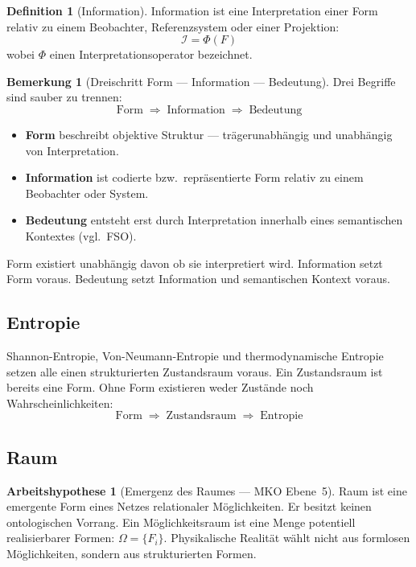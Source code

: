 \documentclass[11pt,a4paper]{article}
\theoremstyle{plain}
\theoremstyle{definition}
\newtheorem{definition}{Definition}[section]
\newtheorem{remark}{Bemerkung}[section]
\newtheorem{hypothese}{Arbeitshypothese}[section]
\begin{document}
\begin{definition}[Information]
Information ist eine Interpretation einer Form relativ zu einem Beobachter,
Referenzsystem oder einer Projektion:
\[
  \mathcal{I} = \Phi(F)
\]
wobei $\Phi$ einen Interpretationsoperator bezeichnet.
\end{definition}

\begin{remark}[Dreischritt Form --- Information --- Bedeutung]
Drei Begriffe sind sauber zu trennen:
\[
  \boxed{\text{Form} \;\Longrightarrow\; \text{Information}
  \;\Longrightarrow\; \text{Bedeutung}}
\]
\begin{itemize}
  \item \textbf{Form} beschreibt objektive Struktur --- tr\"{a}gerunabh\"{a}ngig und
        unabh\"{a}ngig von Interpretation.
  \item \textbf{Information} ist codierte bzw.\ repr\"{a}sentierte Form relativ zu
        einem Beobachter oder System.
  \item \textbf{Bedeutung} entsteht erst durch Interpretation innerhalb eines
        semantischen Kontextes (vgl.\ FSO).
\end{itemize}
Form existiert unabh\"{a}ngig davon ob sie interpretiert wird. Information setzt
Form voraus. Bedeutung setzt Information und semantischen Kontext voraus.
\end{remark}

\subsection{Entropie}

Shannon-Entropie, Von-Neumann-Entropie und thermodynamische Entropie setzen alle
einen strukturierten Zustandsraum voraus. Ein Zustandsraum ist bereits eine Form.
Ohne Form existieren weder Zust\"{a}nde noch Wahrscheinlichkeiten:
\[
  \boxed{\text{Form} \;\Longrightarrow\; \text{Zustandsraum}
  \;\Longrightarrow\; \text{Entropie}}
\]

\subsection{Raum}

\begin{hypothese}[Emergenz des Raumes --- MKO Ebene~5]
Raum ist eine emergente Form eines Netzes relationaler M\"{o}glichkeiten. Er besitzt
keinen ontologischen Vorrang. Ein M\"{o}glichkeitsraum ist eine Menge potentiell
realisierbarer Formen: $\Omega = \{F_i\}$. Physikalische Realit\"{a}t w\"{a}hlt
nicht aus formlosen M\"{o}glichkeiten, sondern aus strukturierten Formen.
\end{hypothese}
\end{document}
